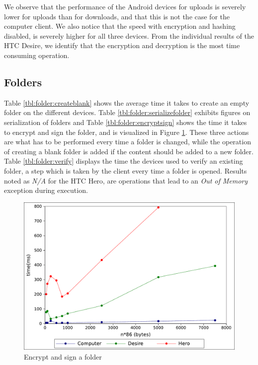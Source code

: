 \documentclass[pdftex,english,10pt,b5paper,twoside]{book}
\begin{document}
We observe that the performance of the Android devices for uploads is severely
lower for uploads than for downloads, and that this is not the case for the
computer client. We also notice that the speed with encryption and hashing
disabled, is severely higher for all three devices. From the individual results
of the HTC Desire, we identify that the encryption and decryption is the most
time consuming operation.

\subsection{Folders}

Table \ref{tbl:folder:createblank} shows the average time it takes to create an
empty folder on the different devices. Table \ref{tbl:folder:serializefolder}
exhibits figures on serialization of folders and Table
\ref{tbl:folder:encryptsign} shows the time it takes to encrypt and sign the
folder, and is visualized in Figure \ref{fig:results:signencrypt}. These three
actions are what has to be performed every time a folder is changed, while the
operation of creating a blank folder is added if the content should be added to
a new folder. Table \ref{tbl:folder:verify} displays the time the devices used
to verify an existing folder, a step which is taken by the client every time a
folder is opened. Results noted as \emph{N/A} for the HTC Hero, are operations
that lead to an \emph{Out of Memory} exception during execution.




\begin{figure}[h!]
    \centering
    \includegraphics[scale=0.6]{graph_signandencrypt.pdf}
    \caption{Encrypt and sign a folder}
    \label{fig:results:signencrypt}
\end{figure}

\end{document}
